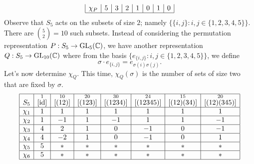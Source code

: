 \begin{exmp}{}
\begin{align*}
\begin{array}{|c|c|c|c|c|c|c|c|}
            \chi_P & 5                  & 3                    & 2                     & 1                      & 0                       & 1                        & 0                         \\ \hline 
        \end{array} 
    \end{align*}
    Observe that $S_5$ acts on the subsets of size $2$; namely 
    $\{\{i, j\} : i, j \in \{1, 2, 3, 4, 5\}\}$. There are $\binom{5}{2} = 10$ 
    such subsets. Instead of considering the permutation representation 
    $P : S_5 \to \operatorname{GL}_5(\mathbb{C})$, we have another representation 
    $Q : S_5 \to \operatorname{GL}_{10}(\mathbb{C})$ where from the basis $\{e_{\{i,j\}} : 
    i, j \in \{1, 2, 3, 4, 5\}\}$, we define 
    \[ \sigma \cdot e_{\{i,j\}} = e_{\sigma(i)\sigma(j)}. \] 
    Let's now determine $\chi_Q$. This time, $\chi_Q(\sigma)$ is the number of sets 
    of size two that are fixed by $\sigma$. 
    \begin{align*}
        \begin{array}{|c|c|c|c|c|c|c|c|}
            \hline
            S_5    & \overset{1}{[\operatorname{id}]} & \overset{10}{[(12)]} & \overset{20}{[(123)]} & \overset{30}{[(1234)]} & \overset{24}{[(12345)]} & \overset{15}{[(12)(34)]} & \overset{20}{[(12)(345)]} \\ \hline
            \chi_1 & 1                  & 1                    & 1                     & 1                      & 1                       & 1                        & 1                         \\ \hline
            \chi_2 & 1                  & -1                   & 1                     & -1                     & 1                       & 1                        & -1                        \\ \hline
            \chi_3 & 4                  & 2                    & 1                     & 0                      & -1                      & 0                        & -1                        \\ \hline
            \chi_4 & 4                  & -2                   & 1                     & 0                      & -1                      & 0                        & 1                         \\ \hline
            \chi_5 & 5                  & *                    & *                     & *                      & *                       & *                        & *                         \\ \hline
            \chi_6 & 5                  & *                    & *                     & *                      & *                       & *                        & *                         \\ \hline

\end{array}
\end{align*}
\end{exmp}
